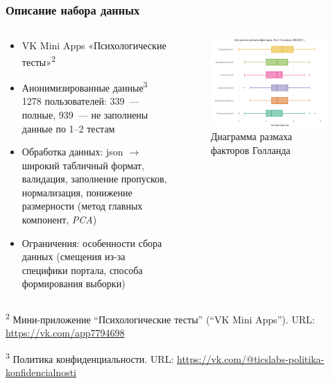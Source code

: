 \documentclass
  [ russian
  , aspectratio=169 %
  ] {beamer}
\begin{document}
\begin{frame}
    \frametitle{Описание набора данных}
    \begin{columns}[T]
    \begin{column}{0.48\textwidth}
        \small
        \begin{itemize}
            \item VK Mini Apps «Психологические тесты»\textsuperscript{2}
            \item Анонимизированные данные\textsuperscript{3} 1278 пользователей: 339~--- полные, 939~--- не заполнены данные по 1--2 тестам
            \item Обработка данных: json $\rightarrow$ широкий табличный формат, валидация, заполнение пропусков, нормализация, понижение размерности (метод главных компонент, \emph{PCA})
            \item Ограничения: особенности сбора данных (смещения из-за специфики портала, способа формирования выборки)
        \end{itemize}
    \end{column}

    \begin{column}{0.52\textwidth}
        \begin{figure}
            \centering
            \includegraphics[width=0.85\linewidth]{figures/HL.png}
            \captionsetup{font=footnotesize}
            \caption{Диаграмма размаха факторов Голланда}
            \label{fig:HL_boxplot}
        \end{figure}
    \end{column}
    
    \end{columns}
  
    \btVFill
    {\scriptsize
        \textsuperscript{2} Мини-приложение \enquote{Психологические тесты} (\enquote{VK Mini Apps}). URL: \url{https://vk.com/app7794698}

        \textsuperscript{3} Политика конфиденциальности. URL: \url{https://vk.com/@ticslabs-politika-konfidencialnosti}
    }
\end{frame}
\end{document}
